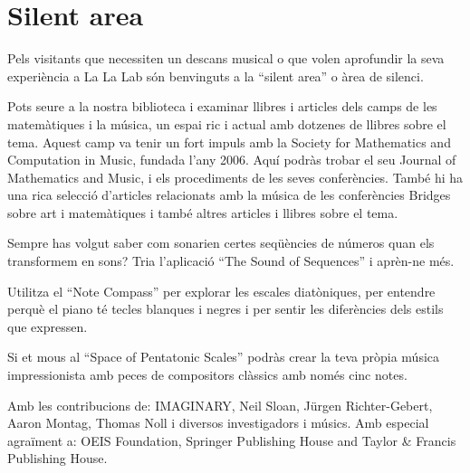 \section{Silent area}
Pels visitants que necessiten un descans musical o que volen aprofundir la seva experiència a La La Lab són benvinguts a la ``silent area'' o àrea de silenci.

Pots seure a la nostra biblioteca i examinar llibres i articles dels camps de les matemàtiques i la música, un espai ric i actual amb dotzenes de llibres sobre el tema. Aquest camp va tenir un fort impuls amb la Society for Mathematics and Computation in Music, fundada l'any 2006. Aquí podràs trobar el seu Journal of Mathematics and Music, i els procediments de les seves conferències. També hi ha una rica selecció d'articles relacionats amb la música de les conferències Bridges sobre art i matemàtiques i també altres articles i llibres sobre el tema.  

Sempre has volgut saber com sonarien certes seqüències de números quan els transformem en sons? Tria l'aplicació ``The Sound of Sequences'' i aprèn-ne més.

Utilitza el ``Note Compass'' per explorar les escales diatòniques, per entendre perquè el piano té tecles blanques i negres i per sentir les diferències dels estils que expressen.

Si et mous al ``Space of Pentatonic Scales'' podràs crear la teva pròpia música impressionista amb peces de compositors clàssics amb només cinc notes.

\vfill

Amb les contribucions de: IMAGINARY, Neil Sloan, Jürgen Richter-Gebert, Aaron Montag, Thomas Noll i diversos investigadors i músics. Amb especial agraïment a: OEIS Foundation, Springer Publishing House and Taylor \& Francis Publishing House.

